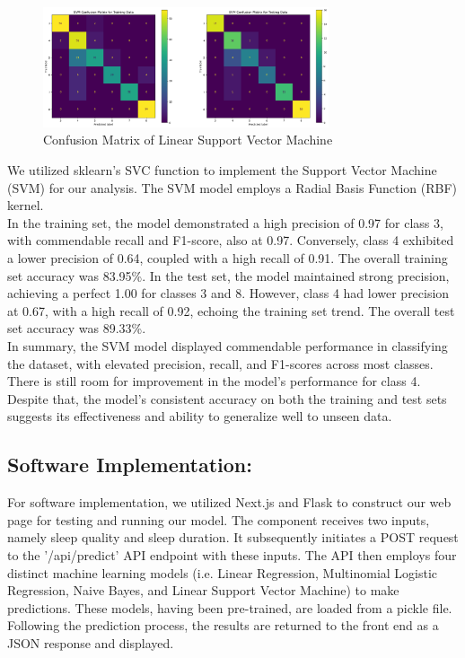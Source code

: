 \documentclass[11pt, letterpaper]{article}
\begin{document}
    \begin{figure}[H]
        \centering
        \includegraphics[width=0.75\textwidth]{svm-confusion-matrix.png}
        \caption{Confusion Matrix of Linear Support Vector Machine}
        \label{fig:confusion-matrix-svm}
    \end{figure}

    \noindent We utilized sklearn's SVC function to implement the Support Vector Machine (SVM) for our analysis. The SVM model employs a Radial Basis Function (RBF) kernel.\\

    \noindent In the training set, the model demonstrated a high precision of 0.97 for class 3, with commendable recall and F1-score, also at 0.97. Conversely, class 4 exhibited a lower precision of 0.64, coupled with a high recall of 0.91. The overall training set accuracy was 83.95\%. In the test set, the model maintained strong precision, achieving a perfect 1.00 for classes 3 and 8. However, class 4 had lower precision at 0.67, with a high recall of 0.92, echoing the training set trend. The overall test set accuracy was 89.33\%.\\
    
    \noindent In summary, the SVM model displayed commendable performance in classifying the dataset, with elevated precision, recall, and F1-scores across most classes. There is still room for improvement in the model's performance for class 4. Despite that, the model's consistent accuracy on both the training and test sets suggests its effectiveness and ability to generalize well to unseen data.

    \noindent\subsection*{Software Implementation:}
    
    \noindent For software implementation, we utilized Next.js and Flask to construct our web page for testing and running our model. The component receives two inputs, namely sleep quality and sleep duration. It subsequently initiates a POST request to the '/api/predict' API endpoint with these inputs. The API then employs four distinct machine learning models (i.e. Linear Regression, Multinomial Logistic Regression, Naive Bayes, and Linear Support Vector Machine) to make predictions. These models, having been pre-trained, are loaded from a pickle file. Following the prediction process, the results are returned to the front end as a JSON response and displayed.
\end{document}

